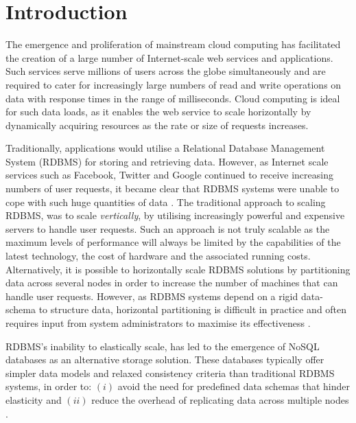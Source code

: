 \chapter{Introduction}
    \graphicspath{{Chapter1-Introduction/Figs/Vector/}{Chapter1-Introduction/Figs/}}
    
    The emergence and proliferation of mainstream cloud computing has facilitated the creation of a large number of Internet-scale web services and applications.  Such services serve millions of users across the globe simultaneously and are required to cater for increasingly large numbers of read and write operations on data with response times in the range of milliseconds. Cloud computing is ideal for such data loads, as it enables the web service to scale horizontally by dynamically acquiring resources as the rate or size of requests increases.  
    
    Traditionally, applications would utilise a Relational Database Management System (RDBMS) for storing and retrieving data.  However, as Internet scale services such as Facebook, Twitter and Google continued to receive increasing numbers of user requests, it became clear that RDBMS systems were unable to cope with such huge quantities of data \citep{DBLP:journals/corr/MoniruzzamanH13}.  The traditional approach to scaling RDBMS, was to scale \emph{vertically}, by utilising increasingly powerful and expensive servers to handle user requests.  Such an approach is not truly scalable as the maximum levels of performance will always be limited by the capabilities of the latest technology, the cost of hardware and the associated running costs.  Alternatively, it is possible to horizontally scale RDBMS solutions by partitioning data across several nodes in order to increase the number of machines that can handle user requests.  However, as RDBMS systems depend on a rigid data-schema to structure data, horizontal partitioning is difficult in practice and often requires input from system administrators to maximise its effectiveness \citep{Han:6106531}.          
    
    RDBMS's inability to elastically scale, has led to the emergence of NoSQL databases as an alternative storage solution.  These databases typically offer simpler data models and relaxed consistency criteria than traditional RDBMS systems, in order to: $(i)$ avoid the need for predefined data schemas that hinder elasticity and $(ii)$ reduce the overhead of replicating data across multiple nodes \citep{Cattell:2011:SSN:1978915.1978919}.  
    
